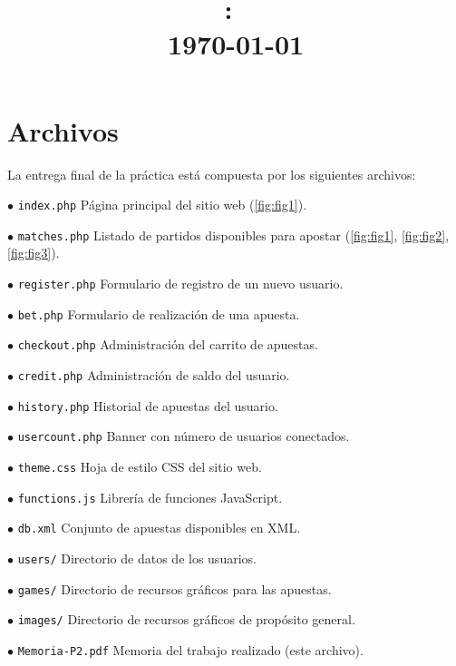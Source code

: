 \documentclass{article}
\title{
    \vspace{2in}
    \textmd{\textbf{\hmwkClass:\ \hmwkTitle}}\\
    \normalsize\vspace{0.1in}\small{\today}\\
    \vspace{3in}
}
\author{\textbf{\hmwkAuthorName}}
\date{} %
\begin{document}
\maketitle



\newpage
\tableofcontents
\newpage

\section{Archivos}
La entrega final de la práctica está compuesta por los siguientes archivos:
\begin{ldescription}
    \item[$\bullet$ \texttt{index.php}]
        Página principal del sitio web ({\small\autoref{fig:fig1}}).
    \item[$\bullet$ \texttt{matches.php}]
        Listado de partidos disponibles para apostar ({\small\autoref{fig:fig1}, \autoref{fig:fig2}, \autoref{fig:fig3}}).
    \item[$\bullet$ \texttt{register.php}]
        Formulario de registro de un nuevo usuario.
    \item[$\bullet$ \texttt{bet.php}]
        Formulario de realización de una apuesta.
    \item[$\bullet$ \texttt{checkout.php}]
        Administración del carrito de apuestas.
    \item[$\bullet$ \texttt{credit.php}]
        Administración de saldo del usuario.
    \item[$\bullet$ \texttt{history.php}]
        Historial de apuestas del usuario.
    \item[$\bullet$ \texttt{usercount.php}]
        Banner con número de usuarios conectados.
    \item[$\bullet$ \texttt{theme.css}]
        Hoja de estilo CSS del sitio web.
    \item[$\bullet$ \texttt{functions.js}]
        Librería de funciones JavaScript.
    \item[$\bullet$ \texttt{db.xml}]
        Conjunto de apuestas disponibles en XML.
    \item[$\bullet$ \texttt{users/}]
        Directorio de datos de los usuarios.
    \item[$\bullet$ \texttt{games/}]
        Directorio de recursos gráficos para las apuestas.
    \item[$\bullet$ \texttt{images/}]
        Directorio de recursos gráficos de propósito general.
    \item[$\bullet$ \texttt{Memoria-P2.pdf}]
        Memoria del trabajo realizado (este archivo).
\end{ldescription}
\newpage
\end{document}
